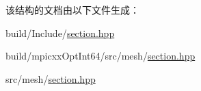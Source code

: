 该结构的文档由以下文件生成：\begin{DoxyCompactItemize}
\item 
build/Include/\hyperlink{build_2Include_2section_8hpp}{section.hpp}\item 
build/mpicxxOptInt64/src/mesh/\hyperlink{build_2mpicxxOptInt64_2src_2mesh_2section_8hpp}{section.hpp}\item 
src/mesh/\hyperlink{src_2mesh_2section_8hpp}{section.hpp}\end{DoxyCompactItemize}

